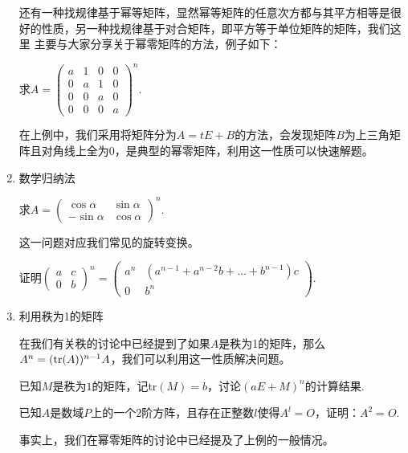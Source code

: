 \begin{enumerate}
	还有一种找规律基于幂等矩阵，显然幂等矩阵的任意次方都与其平方相等是很好的性质，另一种找规律基于对合矩阵，即平方等于单位矩阵的矩阵，我们这里
	主要与大家分享关于幂零矩阵的方法，例子如下：
	\begin{example}
		求$A=\begin{pmatrix}a & 1 & 0 & 0 \\ 0 & a & 1 & 0 \\ 0 & 0 & a & 0 \\ 0 & 0 & 0 & a \end{pmatrix}^n$.
	\end{example}
	在上例中，我们采用将矩阵分为$A=tE+B$的方法，会发现矩阵$B$为上三角矩阵且对角线上全为0，是典型的幂零矩阵，利用这一性质可以快速解题。
	\item 数学归纳法
	\begin{example}
		求$A=\begin{pmatrix}\cos\alpha & \sin\alpha \\ -\sin\alpha & \cos\alpha\end{pmatrix}^n$.
	\end{example}
	这一问题对应我们常见的旋转变换。
	\begin{example}
		证明$\begin{pmatrix}
			a & c \\ 0 & b
		\end{pmatrix}^n=\begin{pmatrix}
			a^n & (a^{n-1}+a^{n-2}b+\dots+b^{n-1})c \\ 0 & b^n
		\end{pmatrix}$.
	\end{example}
	\item 利用秩为1的矩阵
	
	在我们有关秩的讨论中已经提到了如果$A$是秩为1的矩阵，那么$A^n=(\textup{tr}(A))^{n-1}A$，我们可以利用这一性质解决问题。
	\begin{example}
		已知$M$是秩为$1$的矩阵，记\textup{tr}$(M)=b$，讨论$(aE+M)^n$的计算结果.
	\end{example}

	\begin{example}
		已知$A$是数域$P$上的一个$2$阶方阵，且存在正整数$l$使得$A^l=O$，证明：$A^2=O$.
	\end{example}
	事实上，我们在幂零矩阵的讨论中已经提及了上例的一般情况。


\end{enumerate}
